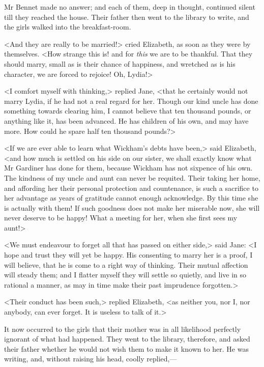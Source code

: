 Mr Bennet made no answer; and each of them, deep in thought, continued silent till they reached the house. Their father then went to the library to write, and the girls walked into the breakfast-room.

<And they are really to be married!> cried Elizabeth, as soon as they were by themselves. <How strange this is! and for \textit{this} we are to be thankful. That they should marry, small as is their chance of happiness, and wretched as is his character, we are forced to rejoice! Oh, Lydia!>

<I comfort myself with thinking,> replied Jane, <that he certainly would not marry Lydia, if he had not a real regard for her. Though our kind uncle has done something towards clearing him, I cannot believe that ten thousand pounds, or anything like it, has been advanced. He has children of his own, and may have more. How could he spare half ten thousand pounds?>

<If we are ever able to learn what Wickham's debts have been,> said Elizabeth, <and how much is settled on his side on our sister, we shall exactly know what Mr Gardiner has done for them, because Wickham has not sixpence of his own. The kindness of my uncle and aunt can never be requited. Their taking her home, and affording her their personal protection and countenance, is such a sacrifice to her advantage as years of gratitude cannot enough acknowledge. By this time she is actually with them! If such goodness does not make her miserable now, she will never deserve to be happy! What a meeting for her, when she first sees my aunt!>

<We must endeavour to forget all that has passed on either side,> said Jane: <I hope and trust they will yet be happy. His consenting to marry her is a proof, I will believe, that he is come to a right way of thinking. Their mutual affection will steady them; and I flatter myself they will settle so quietly, and live in so rational a manner, as may in time make their past imprudence forgotten.>

<Their conduct has been such,> replied Elizabeth, <as neither you, nor I, nor anybody, can ever forget. It is useless to talk of it.>

It now occurred to the girls that their mother was in all likelihood perfectly ignorant of what had happened. They went to the library, therefore, and asked their father whether he would not wish them to make it known to her. He was writing, and, without raising his head, coolly replied,—

